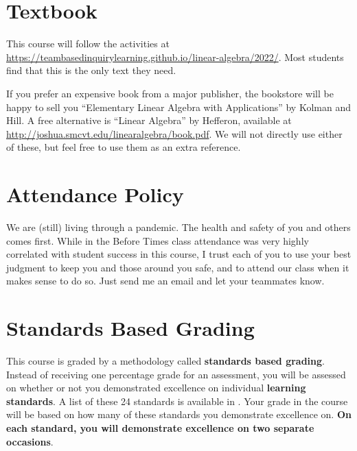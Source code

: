 \documentclass{article}
\begin{document}
\section*{\fontsize{12}{15}\selectfont Textbook}
This course will follow the activities at \url{https://teambasedinquirylearning.github.io/linear-algebra/2022/}. Most students find that this is the only text they need.

If you prefer an expensive book from a major publisher, the bookstore will be happy to sell you ``Elementary Linear Algebra with Applications'' by Kolman and Hill.  A free alternative is ``Linear Algebra'' by Hefferon, available at \url{http://joshua.smcvt.edu/linearalgebra/book.pdf}. We will not directly use either of these, but feel free to use them as an extra reference.


\section*{\fontsize{12}{15}\selectfont Attendance Policy}
We are (still) living through a pandemic. The health and safety of you and others comes first. While in the Before Times class attendance was very highly correlated with student success in this course, I trust each of you to use your best judgment to keep you and those around you safe, and to attend our class when it makes sense to do so.  Just send me an email and let your teammates know.

\section*{\fontsize{12}{15}\selectfont Standards Based Grading}
This course is graded by a methodology called {\bf standards based grading}.  Instead of receiving one percentage grade for an assessment, you will be assessed on whether or not you demonstrated excellence on individual {\bf learning standards}.  A list of these 24 standards is available in \LMS.  Your grade in the course will be based on how many of these standards you demonstrate excellence on.  {\bf On each standard, you will demonstrate excellence on two separate occasions}.
\end{document}

